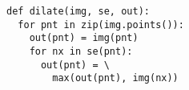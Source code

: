 \documentclass[varwidth=4cm, border={0.1cm 0.1cm 0.1cm 0.1cm}]{standalone}
\begin{document}
\begin{verbatim}
def dilate(img, se, out):
  for pnt in zip(img.points()):
    out(pnt) = img(pnt)
    for nx in se(pnt):
      out(pnt) = \
        max(out(pnt), img(nx))
\end{verbatim}
\end{document}
